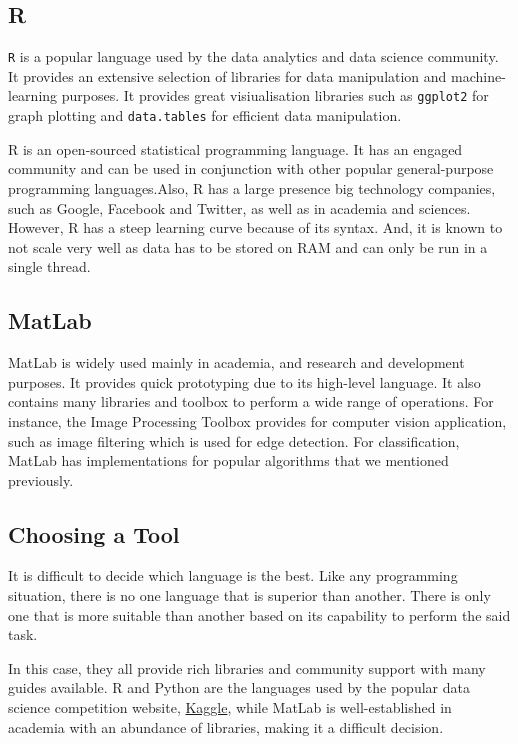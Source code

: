 \subsection{R}
\texttt{R} is a popular language used by the data analytics and data science community. It provides an extensive selection of libraries for data manipulation and machine-learning purposes. It provides great visiualisation libraries such as \texttt{ggplot2} for graph plotting and \texttt{data.tables} for efficient data manipulation.

R is an open-sourced statistical programming language. It has an engaged community and can be used in conjunction with other popular general-purpose programming languages.Also, R has a large presence big technology companies, such as Google, Facebook and Twitter, as well as in academia and sciences. \footnotemark  However, R has a steep learning curve because of its syntax. And, it is known to not scale very well as data has to be stored on RAM and can only be run in a single thread.


\subsection{MatLab}
MatLab is widely used mainly in academia, and research and development purposes. It provides quick prototyping due to its high-level language. It also contains many libraries and toolbox to perform a wide range of operations. For instance, the Image Processing Toolbox provides for computer vision application, such as image filtering which is used for edge detection. For classification, MatLab has implementations for popular algorithms that we mentioned previously.

\subsection{Choosing a Tool}
It is difficult to decide which language is the best. Like any programming situation, there is no one language that is superior than another. There is only one that is more suitable than another based on its capability to perform the said task.

In this case, they all provide rich libraries and community support with many guides available. R and Python are the languages used by the popular data science competition website, \href{http://www.kaggle.com}{Kaggle}, while MatLab is well-established in academia with an abundance of libraries, making it a difficult decision.

